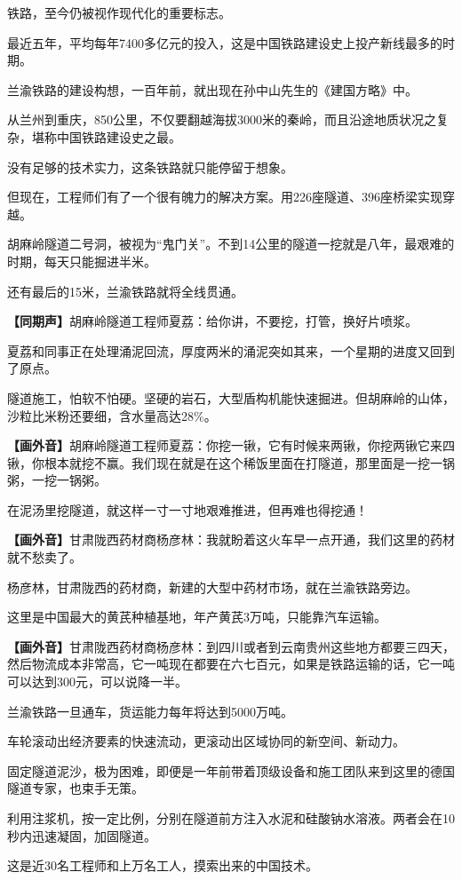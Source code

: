 \documentclass{ctexart}
\newcommand{\zkh}[1]{\textbf{\hspace{-2.7em} 【#1】}}
\begin{document}
 铁路，至今仍被视作现代化的重要标志。

最近五年，平均每年7400多亿元的投入，这是中国铁路建设史上投产新线最多的时期。

 
兰渝铁路的建设构想，一百年前，就出现在孙中山先生的《建国方略》中。

从兰州到重庆，850公里，不仅要翻越海拔3000米的秦岭，而且沿途地质状况之复杂，堪称中国铁路建设史之最。

 没有足够的技术实力，这条铁路就只能停留于想象。

但现在，工程师们有了一个很有魄力的解决方案。用226座隧道、396座桥梁实现穿越。

胡麻岭隧道二号洞，被视为``鬼门关''。不到14公里的隧道一挖就是八年，最艰难的时期，每天只能掘进半米。

 还有最后的15米，兰渝铁路就将全线贯通。

 \zkh{同期声}胡麻岭隧道工程师夏荔：给你讲，不要挖，打管，换好片喷浆。

 
夏荔和同事正在处理涌泥回流，厚度两米的涌泥突如其来，一个星期的进度又回到了原点。

隧道施工，怕软不怕硬。坚硬的岩石，大型盾构机能快速掘进。但胡麻岭的山体，沙粒比米粉还要细，含水量高达28{\%}。

\zkh{画外音}胡麻岭隧道工程师夏荔：你挖一锹，它有时候来两锹，你挖两锹它来四锹，你根本就挖不赢。我们现在就是在这个稀饭里面在打隧道，那里面是一挖一锅粥，一挖一锅粥。

 在泥汤里挖隧道，就这样一寸一寸地艰难推进，但再难也得挖通！

\zkh{画外音}甘肃陇西药材商杨彦林：我就盼着这火车早一点开通，我们这里的药材就不愁卖了。

 
杨彦林，甘肃陇西的药材商，新建的大型中药材市场，就在兰渝铁路旁边。

 这里是中国最大的黄芪种植基地，年产黄芪3万吨，只能靠汽车运输。

\zkh{画外音}甘肃陇西药材商杨彦林：到四川或者到云南贵州这些地方都要三四天，然后物流成本非常高，它一吨现在都要在六七百元，如果是铁路运输的话，它一吨可以达到300元，可以说降一半。

 兰渝铁路一旦通车，货运能力每年将达到5000万吨。

 车轮滚动出经济要素的快速流动，更滚动出区域协同的新空间、新动力。

固定隧道泥沙，极为困难，即便是一年前带着顶级设备和施工团队来到这里的德国隧道专家，也束手无策。

利用注浆机，按一定比例，分别在隧道前方注入水泥和硅酸钠水溶液。两者会在10秒内迅速凝固，加固隧道。

 这是近30名工程师和上万名工人，摸索出来的中国技术。
\end{document}
